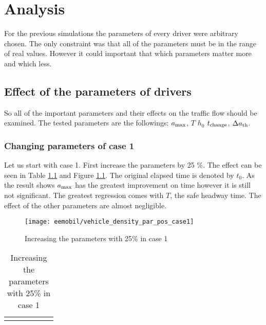 \chapter{Analysis}
		For the previous simulations the parameters of every driver were arbitrary chosen. The only constraint was that all of the parameters must be in the range of real values. However it could important that which parameters matter more and which less.
	\section{Effect of the parameters of drivers}
		So all of the important parameters and their effects on the traffic flow should be examined. The tested parameters are the followings: $a_{\rm max}$, $T$ $h_0$ $t_{\rm change} $, $\Delta a_{\rm th}$.
		\subsection{Changing parameters of case 1}
		Let us start with case 1. First increase the parameters by 25 \%. The effect can be seen in Table \ref{tab:vehicle_density_par_pos_case_1} and Figure \ref{fig:vehicle_density_par_pos_case_1}. The original elapsed time is denoted by $t_0$. As the result shows $a_{\rm max}$ has the greatest improvement on time however it is still not significant. The greatest regression comes with $T$, the safe headway time. The effect of the other parameters are almost negligible.
		\begin{figure}[ht]
			\centering
			\texttt{[image: eemobil/vehicle\_density\_par\_pos\_case1]}
			\caption{Increasing the parameters with 25\% in case 1}
			\label{fig:vehicle_density_par_pos_case_1}
		\end{figure}
		\begin{table}[ht]
			\begin{center}
				\begin{tabular}{ |c|c|c|c|c|c|}
				\hline
				\vehicledensitypartable{1}
				\hline
				\end{tabular}
			\end{center}
			\caption{Increasing the parameters with 25\% in case 1}
			\label{tab:vehicle_density_par_pos_case_1}
		\end{table}
		
